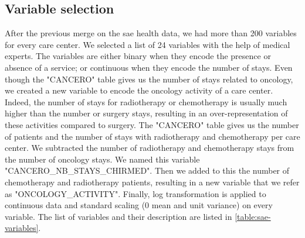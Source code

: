 \subsection{Variable selection}

After the previous merge on the \ac{sae} health data, we had more than 200 variables for every care center. We selected a list of 24 variables with the help of medical experts. The variables are either binary when they encode the presence or absence of a service; or continuous when they encode the number of stays. Even though the "CANCERO" table gives us the number of stays related to oncology, we created a new variable to encode the oncology activity of a care center. Indeed, the number of stays for radiotherapy or chemotherapy is usually much higher than the number or surgery stays, resulting in an over-representation of these activities compared to surgery. The "CANCERO" table gives us the number of patients and the number of stays with radiotherapy and chemotherapy per care center. We subtracted the number of radiotherapy and chemotherapy stays from the number of oncology stays. We named this variable "CANCERO\_NB\_STAYS\_CHIRMED". Then we added to this the number of chemotherapy and radiotherapy patients, resulting in a new variable that we refer as "ONCOLOGY\_ACTIVITY". Finally, log transformation is applied to continuous data and standard scaling (0 mean and unit variance) on every variable. The list of variables and their description are listed in \cref{table:sae-variables}.

